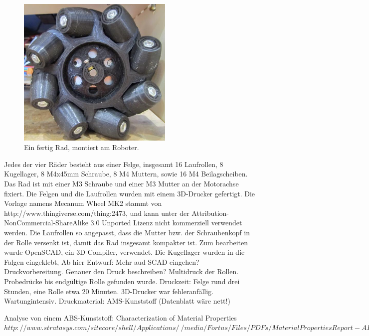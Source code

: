\documentclass[a4paper,bibtotoc,oneside]{scrbook}
\begin{document}
\begin{figure}[htbp]
\centering
\includegraphics[width=75mm]{img/rad.jpg}
\caption{Ein fertig Rad, montiert am Roboter.}\label{rad2}
\end{figure}

Jedes der vier Räder besteht aus einer Felge, insgesamt 16 Laufrollen, 8 Kugellager, 8 M4x45mm Schraube, 8 M4 Muttern, sowie 16 M4 Beilagscheiben. 
Das Rad ist mit einer M3 Schraube und einer M3 Mutter an der Motorachse fixiert.
Die Felgen und die Laufrollen wurden mit einem 3D-Drucker gefertigt. 
Die Vorlage namens Mecanum Wheel MK2 stammt von http://www.thingiverse.com/thing:2473, und kann unter der Attribution-NonCommercial-ShareAlike 3.0 Unported Lizenz nicht kommerziell verwendet werden.
Die Laufrollen so angepasst, dass die Mutter bzw. der Schraubenkopf in der Rolle versenkt ist, damit das Rad insgesamt kompakter ist. Zum bearbeiten wurde OpenSCAD, ein 3D-Compiler, verwendet. 
Die Kugellager wurden in die Falgen eingeklebt,
\newline
\newline
Ab hier Entwurf: Mehr aud SCAD eingehen? Druckvorbereitung. Genauer den Druck beschreiben? Multidruck der Rollen. 
Probedrücke bis endgültige Rolle gefunden wurde.
Druckzeit: Felge rund drei Stunden, eine Rolle etwa 20 Minuten.
3D-Drucker war fehleranfällig. Wartungintensiv. Druckmaterial: AMS-Kunststoff (Datenblatt wäre nett!)

Analyse von einem ABS-Kunststoff: Characterization of Material Properties
$http://www.stratasys.com/sitecore/shell/Applications/~/media/Fortus/Files/PDFs/MaterialPropertiesReport-ABS-M30.pdf?utm_source=materials_study_news_release_August_2011$ 
\end{document}
